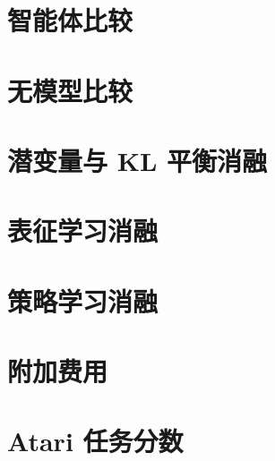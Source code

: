 \clearpage
\vspace*{-8ex}
\section{智能体比较}


\clearpage
\vspace*{-9ex}
\section{无模型比较}
\vspace*{-2ex}


\clearpage
\vspace*{-9ex}
\section{潜变量与 KL 平衡消融}
\vspace*{-2ex}


\clearpage
\vspace*{-9ex}
\section{表征学习消融}
\vspace*{-2ex}


\clearpage
\vspace*{-9ex}
\section{策略学习消融}
\vspace*{-2ex}


\clearpage
\vspace*{-9ex}
\section{附加费用}
\vspace*{-2ex}


\clearpage
\vspace*{-9ex}
\section{Atari 任务分数}
\vspace*{-2ex}

